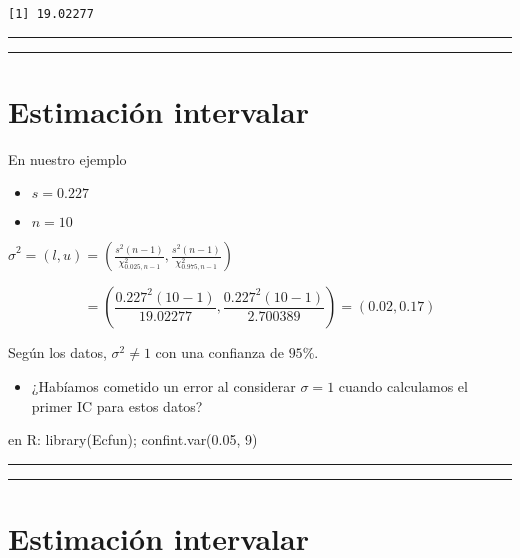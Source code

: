 \documentclass[
]{book}
\providecommand{\tightlist}{%
  \setlength{\itemsep}{0pt}\setlength{\parskip}{0pt}}
\begin{document}
\begin{verbatim}
[1] 19.02277
\end{verbatim}

\begin{center}\rule{0.5\linewidth}{0.5pt}\end{center}

\begin{center}\rule{0.5\linewidth}{0.5pt}\end{center}

\hypertarget{estimaciuxf3n-intervalar-7}{%
\section{Estimación intervalar}\label{estimaciuxf3n-intervalar-7}}

En nuestro ejemplo

\begin{itemize}
\tightlist
\item
  \(s=0.227\)
\item
  \(n=10\)
\end{itemize}

\(\hat{\sigma}^2=(l,u) = (\frac{s^2 (n-1)}{\chi^2_{0.025,n-1}},\frac{s^2( n-1)}{\chi^2_{0.975,n-1}})\)

\[= (\frac{0.227^2 (10-1)}{19.02277},\frac{0.227^2(10-1)}{2.700389})=(0.02,0.17)\]

Según los datos, \(\sigma^2 \neq 1\) con una confianza de \(95\%\).

\begin{itemize}
\tightlist
\item
  ¿Habíamos cometido un error al considerar \(\sigma=1\) cuando calculamos el primer IC para estos datos?
\end{itemize}

en R: library(Ecfun);
confint.var(0.05, 9)

\begin{center}\rule{0.5\linewidth}{0.5pt}\end{center}

\begin{center}\rule{0.5\linewidth}{0.5pt}\end{center}

\hypertarget{estimaciuxf3n-intervalar-8}{%
\section{Estimación intervalar}\label{estimaciuxf3n-intervalar-8}}
\end{document}
